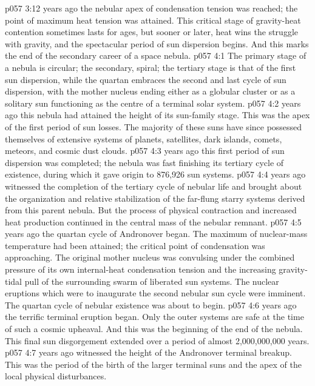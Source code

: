\vs p057 3:12 \pc {} years ago the nebular apex of condensation tension was reached; the point of maximum heat tension was attained. This critical stage of gravity\hyp{}heat contention sometimes lasts for ages, but sooner or later, heat wins the struggle with gravity, and the spectacular period of sun dispersion begins. And this marks the end of the secondary career of a space nebula.
\vs p057 4:1 The primary stage of a nebula is circular; the secondary, spiral; the tertiary stage is that of the first sun dispersion, while the quartan embraces the second and last cycle of sun dispersion, with the mother nucleus ending either as a globular cluster or as a solitary sun functioning as the centre of a terminal solar system.
\vs p057 4:2 \pc {} years ago this nebula had attained the height of its sun\hyp{}family stage. This was the apex of the first period of sun losses. The majority of these suns have since possessed themselves of extensive systems of planets, satellites, dark islands, comets, meteors, and cosmic dust clouds.
\vs p057 4:3 \pc {} years ago this first period of sun dispersion was completed; the nebula was fast finishing its tertiary cycle of existence, during which it gave origin to 876,926 sun systems.
\vs p057 4:4 \pc {} years ago witnessed the completion of the tertiary cycle of nebular life and brought about the organization and relative stabilization of the far\hyp{}flung starry systems derived from this parent nebula. But the process of physical contraction and increased heat production continued in the central mass of the nebular remnant.
\vs p057 4:5 \pc {} years ago the quartan cycle of Andronover began. The maximum of nuclear\hyp{}mass temperature had been attained; the critical point of condensation was approaching. The original mother nucleus was convulsing under the combined pressure of its own internal\hyp{}heat condensation tension and the increasing gravity\hyp{}tidal pull of the surrounding swarm of liberated sun systems. The nuclear eruptions which were to inaugurate the second nebular sun cycle were imminent. The quartan cycle of nebular existence was about to begin.
\vs p057 4:6 \pc {} years ago the terrific terminal eruption began. Only the outer systems are safe at the time of such a cosmic upheaval. And this was the beginning of the end of the nebula. This final sun disgorgement extended over a period of almost 2,000,000,000 years.
\vs p057 4:7 \pc {} years ago witnessed the height of the Andronover terminal breakup. This was the period of the birth of the larger terminal suns and the apex of the local physical disturbances.
